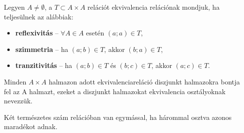 \begin{definition}[Ekvivalenciareláció]
  Legyen $A \neq \emptyset$, a $T \subset A \times A$ relációt ekvivalencia%
  relációnak mondjuk, ha teljesülnek az alábbiak:
  \begin{itemize}
    \item \textbf{reflexivitás} -- $\forall A \in A$ esetén $(a; a) \in T$,
    \item \textbf{szimmetria} -- ha $(a; b) \in T$, akkor $(b; a) \in T$,
    \item \textbf{tranzitivitás} -- ha $(a; b) \in T$ és $(b; c) \in T$, akkor
          $(a; c) \in T$.
  \end{itemize}
\end{definition}

\begin{theorem}
  Minden $A \times A$ halmazon adott ekvivalenciareláció diszjunkt halmazokra
  bontja fel az A halmazt, ezeket a diszjunkt halmazokat ekvivalencia%
  osztályoknak nevezzük.
\end{theorem}

\begin{example}
  \samepage
  Két természetes szám relációban van egymással, ha hárommal osztva azonos
  maradékot adnak.
  \begin{center}
  \end{center}
\end{example}

